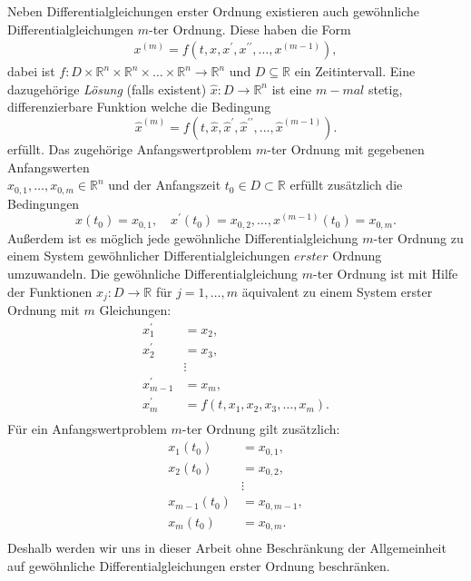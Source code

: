 \begin{bem}
    Neben Differentialgleichungen erster Ordnung existieren auch gewöhnliche Differentialgleichungen $m$-ter Ordnung.
    Diese haben die Form
    \begin{align}
        x^{(m)} = f(t, x, x^{\prime}, x^{\prime\prime}, \dots, x^{(m-1)}),
    \end{align}
    dabei ist
    $
    f : D \times \mathbb{R}^{n} \times \mathbb{R}^{n} \times \dots \times \mathbb{R}^{n} \rightarrow \mathbb{R}^{n}
    $
    und $D \subseteq \mathbb{R}$ ein Zeitintervall. Eine dazugehörige \textit{Lösung} (falls existent)
    $\hat{x} : D \rightarrow \mathbb{R}^n$ ist eine $m-mal$ stetig, differenzierbare Funktion welche die Bedingung
    \[
        \hat{x}^{(m)} = f(t, \hat{x},\hat{x}^{\prime},\hat{x}^{\prime\prime}, \dots,\hat{x}^{(m-1)}).
    \]
    erfüllt. Das zugehörige Anfangswertproblem $m$-ter Ordnung mit gegebenen Anfangswerten \\
    $x_{0,1},\dots,x_{0,m} \in \mathbb{R}^{n}$ und der Anfangszeit $t_0 \in D \subset \mathbb{R}$ erfüllt zusätzlich die
    Bedingungen \[
        x(t_{0})=x_{0,1},\quad x^{\prime}(t_{0})=x_{0,2},\dots,x^{(m-1)}(t_{0})=x_{0,m}.
    \]
    Außerdem ist es möglich jede gewöhnliche Differentialgleichung $m$-ter Ordnung zu einem System gewöhnlicher
    Differentialgleichungen $erster$ Ordnung umzuwandeln. Die gewöhnliche Differentialgleichung $m$-ter Ordnung ist mit
    Hilfe der Funktionen $x_{j}:D \rightarrow \mathbb{R}$ für $j = 1,\dots,m$ äquivalent zu einem System erster Ordnung mit $m$
    Gleichungen:
    \begin{align}
        x_{1}^{\prime}&=x_{2}, \nonumber \\
        x_{2}^{\prime}&=x_{3}, \nonumber \\
        &\vdots\\
        x_{m-1}^{\prime}&=x_{m}, \nonumber \\
        x_{m}^{\prime}&=f(t, x_{1}, x_{2}, x_{3}, \ldots, x_{m}). \nonumber \\ \nonumber
    \end{align}
    Für ein Anfangswertproblem $m$-ter Ordnung gilt zusätzlich:
    \begin{align}
        x_{1}(t_{0})&=x_{0,1}, \nonumber \\
        x_{2}(t_{0})&=x_{0,2}, \nonumber \\
        &\vdots \\
        x_{m-1}(t_{0})&=x_{0,m-1}, \nonumber \\
        x_{m}(t_{0})&=x_{0,m}. \nonumber \\ \nonumber
    \end{align}
    Deshalb werden wir uns in dieser Arbeit ohne Beschränkung der Allgemeinheit auf gewöhnliche Differentialgleichungen
    erster Ordnung beschränken.
\end{bem}
